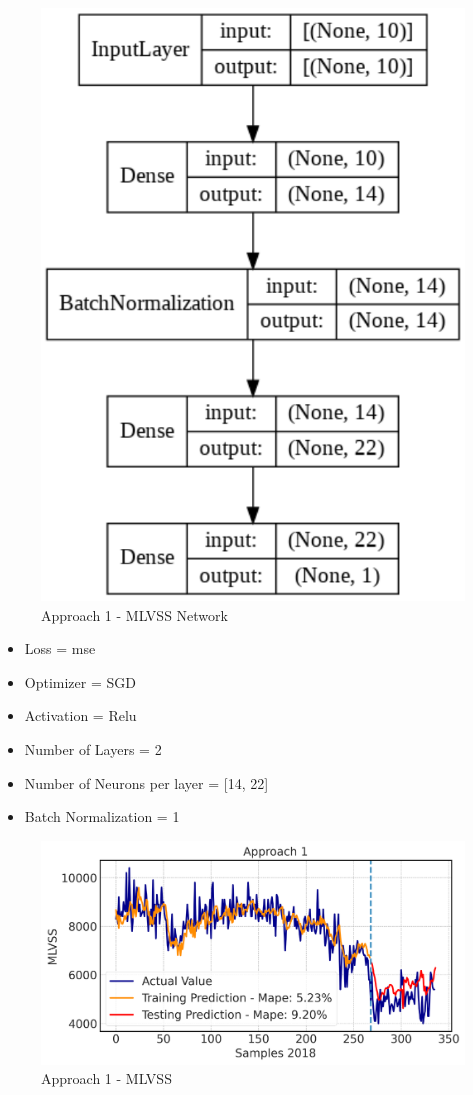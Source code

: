 \begin{figure}[h!]
\centering
\includegraphics[width=0.4\linewidth]{figures/Ch5/App1_MLVSS.pdf}
\caption{Approach 1 - MLVSS Network}
\label{f:App1-MLVSS-nn}
\end{figure}

\begin{itemize}
    \item Loss = mse
    \item Optimizer = SGD
    \item Activation =  Relu
    \item Number of Layers = 2
    \item Number of Neurons per layer = [14, 22]
    \item Batch Normalization = 1
\end{itemize}
\begin{figure}[h]
\centering
\includegraphics[width=\linewidth]{figures/Ch5/MLVSS-approach1.pdf}
\caption{Approach 1 - MLVSS}
\label{f:App1-MLVSS}
\end{figure}





